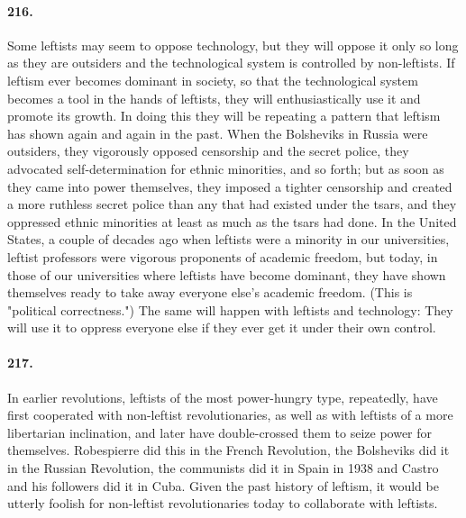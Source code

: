 \documentclass[12pt]{book}
\begin{document}
\paragraph{216.}  Some leftists may seem to oppose technology, but they will oppose it only so long as they are outsiders and the technological system is controlled by non-leftists. If leftism ever becomes dominant in society, so that the technological system becomes a tool in the hands of leftists, they will enthusiastically use it and promote its growth. In doing this they will be repeating a pattern that leftism has shown again and again in the past. When the Bolsheviks in Russia were outsiders, they vigorously opposed censorship and the secret police, they advocated self-determination for ethnic minorities, and so forth; but as soon as they came into power themselves, they imposed a tighter censorship and created a more ruthless secret police than any that had existed under the tsars, and they oppressed ethnic minorities at least as much as the tsars had done. In the United States, a couple of decades ago when leftists were a minority in our universities, leftist professors were vigorous proponents of academic freedom, but today, in those of our universities where leftists have become dominant, they have shown themselves ready to take away everyone else's academic freedom. (This is "political correctness.") The same will happen with leftists and technology: They will use it to oppress everyone else if they ever get it under their own control.


\paragraph{217.} In earlier revolutions, leftists of the most power-hungry type, repeatedly, have first cooperated with non-leftist revolutionaries, as well as with leftists of a more libertarian inclination, and later have double-crossed them to seize power for themselves. Robespierre did this in the French Revolution, the Bolsheviks did it in the Russian Revolution, the communists did it in Spain in 1938 and Castro and his followers did it in Cuba. Given the past history of leftism, it would be utterly foolish for non-leftist revolutionaries today to collaborate with leftists.
\end{document}
